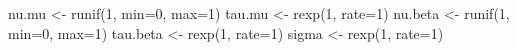 \documentclass[
]{article}
\newenvironment{Shaded}{\begin{snugshade}}{\end{snugshade}}
\newcommand{\AttributeTok}[1]{\textcolor[rgb]{0.77,0.63,0.00}{#1}}
\newcommand{\DecValTok}[1]{\textcolor[rgb]{0.00,0.00,0.81}{#1}}
\newcommand{\FunctionTok}[1]{\textcolor[rgb]{0.00,0.00,0.00}{#1}}
\newcommand{\NormalTok}[1]{#1}
\newcommand{\OtherTok}[1]{\textcolor[rgb]{0.56,0.35,0.01}{#1}}
\begin{document}
\begin{Shaded}
\begin{Highlighting}[]
\NormalTok{nu.mu }\OtherTok{\textless{}{-}} \FunctionTok{runif}\NormalTok{(}\DecValTok{1}\NormalTok{, }\AttributeTok{min=}\DecValTok{0}\NormalTok{, }\AttributeTok{max=}\DecValTok{1}\NormalTok{)}
\NormalTok{tau.mu }\OtherTok{\textless{}{-}} \FunctionTok{rexp}\NormalTok{(}\DecValTok{1}\NormalTok{, }\AttributeTok{rate=}\DecValTok{1}\NormalTok{)}
\NormalTok{nu.beta }\OtherTok{\textless{}{-}} \FunctionTok{runif}\NormalTok{(}\DecValTok{1}\NormalTok{, }\AttributeTok{min=}\DecValTok{0}\NormalTok{, }\AttributeTok{max=}\DecValTok{1}\NormalTok{)}
\NormalTok{tau.beta }\OtherTok{\textless{}{-}} \FunctionTok{rexp}\NormalTok{(}\DecValTok{1}\NormalTok{, }\AttributeTok{rate=}\DecValTok{1}\NormalTok{)}
\NormalTok{sigma }\OtherTok{\textless{}{-}} \FunctionTok{rexp}\NormalTok{(}\DecValTok{1}\NormalTok{, }\AttributeTok{rate=}\DecValTok{1}\NormalTok{)}


\end{Highlighting}
\end{Shaded}
\end{document}
